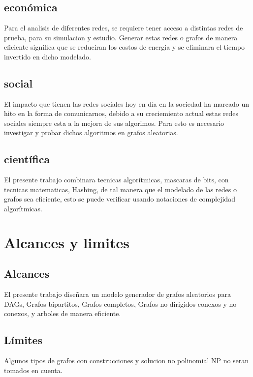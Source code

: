 \documentclass[11pt]{extarticle}
\begin{document}
\section{\justificacion}
  \subsection{\justificacion econ\'omica}
    Para el analisis de diferentes redes, se requiere tener acceso a distintas redes de prueba, para su simulacion y estudio.
    Generar  estas redes o grafos de manera eficiente significa que se reduciran los costos de energia y se
    eliminara el tiempo invertido en dicho modelado.
  \subsection{\justificacion social}
    El impacto que tienen las redes sociales hoy en d\'ia en la sociedad ha marcado un hito en la forma de comunicarnos,
    debido a su creciemiento actual estas redes sociales siempre esta a la mejora de sus algorimos.
    Para esto es necesario investigar y probar dichos algoritmos en grafos aleatorias.
  \subsection{\justificacion cient\'ifica}
    El presente trabajo combinara tecnicas algor\'itmicas, mascaras de bits, con tecnicas
    matematicas, Hashing, de tal manera que el modelado de las redes o grafos sea eficiente,
    esto se puede verificar usando notaciones de complejidad algor\'itmicas.
\section{Alcances y limites}
  \subsection{Alcances}
    \begin{itemize}
      \guion El presente trabajo diseñara un modelo generador de grafos aleatorios
            para DAGs, Grafos bipartitos, Grafos completos, Grafos no dirigidos
            conexos y no conexos, y arboles de manera eficiente.
      \end{itemize}
  \subsection{L\'imites}
    \begin{itemize}
      \guion Algunos tipos de grafos con construcciones y solucion no polinomial NP no seran tomados en cuenta.
    \end{itemize}
\end{document}
